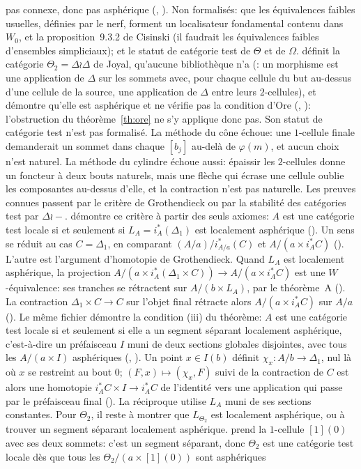 pas connexe, donc pas asphérique (, ). Non formalisés: que les équivalences faibles usuelles, définies par le nerf, forment un localisateur fondamental contenu dans $W_0$, et la proposition~9.3.2 de Cisinski (il faudrait les équivalences faibles d'ensembles simpliciaux); et le statut de catégorie test de $\Theta$ et de $\Omega$.  définit la catégorie $\Theta_2=\Delta\wr\Delta$ de Joyal, qu'aucune bibliothèque n'a (: un morphisme est une application de $\Delta$ sur les sommets avec, pour chaque cellule du but au-dessus d'une cellule de la source, une application de $\Delta$ entre leurs $2$-cellules), et démontre qu'elle est asphérique et ne vérifie pas la condition d'Ore (, ): l'obstruction du théorème~\ref{th:ore} ne s'y applique donc pas. Son statut de catégorie test n'est pas formalisé. La méthode du cône échoue: une $1$-cellule finale demanderait un sommet dans chaque $[b_j]$ au-delà de $\varphi(m)$, et aucun choix n'est naturel. La méthode du cylindre échoue aussi: épaissir les $2$-cellules donne un foncteur à deux bouts naturels, mais une flèche qui écrase une cellule oublie les composantes au-dessus d'elle, et la contraction n'est pas naturelle. Les preuves connues passent par le critère de Grothendieck \cite[th.~4.1.19]{cisinski-308} ou par la stabilité des catégories test par $\Delta\wr-$.  démontre ce critère à partir des seuls axiomes: $A$ est une catégorie test locale si et seulement si $L_A=i_A^*(\Delta_1)$ est localement asphérique (). Un sens se réduit au cas $C=\Delta_1$, en comparant $(A/a)/i_{A/a}^*(C)$ et $A/(a\times i_A^*C)$ (). L'autre est l'argument d'homotopie de Grothendieck. Quand $L_A$ est localement asphérique, la projection $A/(a\times i_A^*(\Delta_1\times C))\to A/(a\times i_A^*C)$ est une $W$-équivalence: ses tranches se rétractent sur $A/(b\times L_A)$, par le théorème~A (). La contraction $\Delta_1\times C\to C$ sur l'objet final rétracte alors $A/(a\times i_A^*C)$ sur $A/a$ (). Le même fichier démontre la condition (iii) du théorème: $A$ est une catégorie test locale si et seulement si elle a un segment séparant localement asphérique, c'est-à-dire un préfaisceau $I$ muni de deux sections globales disjointes, avec tous les $A/(a\times I)$ asphériques (, ). Un point $x\in I(b)$ définit $\chi_x\colon A/b\to\Delta_1$, nul là où $x$ se restreint au bout $0$; $(F,x)\mapsto(\chi_x,F)$ suivi de la contraction de $C$ est alors une homotopie $i_A^*C\times I\to i_A^*C$ de l'identité vers une application qui passe par le préfaisceau final (). La réciproque utilise $L_A$ muni de ses sections constantes. Pour $\Theta_2$, il reste à montrer que $L_{\Theta_2}$ est localement asphérique, ou à trouver un segment séparant localement asphérique.  prend la $1$-cellule $[1](0)$ avec ses deux sommets: c'est un segment séparant, donc $\Theta_2$ est une catégorie test locale dès que tous les $\Theta_2/(a\times[1](0))$ sont asphériques 